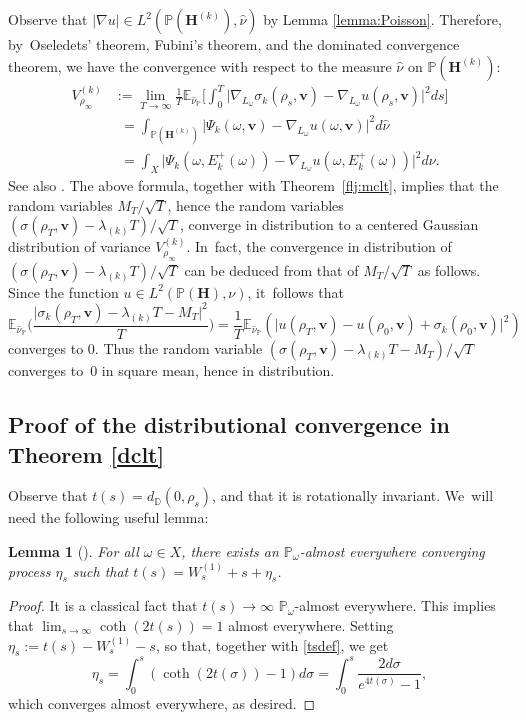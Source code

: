\documentclass[JEP,XML,SOM,Unicode,published]{cedram}
\theoremstyle{plain}
\newtheorem{lemma}[thm]{Lemma}
\theoremstyle{definition}
\numberwithin{equation}{subsection}
\newcommand\bD{\mathbb{D}}
\newcommand\bE{\mathbb{E}}
\newcommand\bP{\mathbb{P}}
\let\gradient\nabla
\newcommand{\bfH}{\boldsymbol{H}}
\newcommand{\bfv}{\boldsymbol{v}}
\newcommand{\bbE}[1]{\bE_{\hat{\nu}_\bP}\biggl[ #1 \biggr]}
\newcommand{\defeq}{:=}
\begin{document}
Observe that $|\gradient u| \in L^2(\bP(\bfH^{(k)}),\hat\nu)$ by Lemma \ref{lemma:Poisson}.
Therefore, by~Oseledets’ theorem, Fubini's theorem, and the dominated convergence theorem, we have the convergence with respect to the measure $\hat{\nu}$ on $\bP(\bfH^{(k)})$:
\begin{equation}
\label{variance}
\begin{aligned}
V^{(k)}_{\rho_\infty} &\defeq \lim_{T\to\infty} \frac{1}{T}\bbE{\int_0^T \bigl| \gradient_{L_\omega}\sigma_k(\rho_s,{\bfv})- \gradient_{L_\omega}u(\rho_s,{\bfv}) \bigr|^2ds} \\
&\phantom{:}= \int_{\bP(\bfH^{(k)})} \bigl |\Psi_k (\omega,{\bfv})-\gradient_{L_\omega}u(\omega,\bfv) \bigr|^2d \hat{\nu} \\
&\phantom{:}=\int_{X} \bigl |\Psi_k (\omega,E^+_k(\omega)) -
\gradient_{L_\omega}u(\omega,E^+_k(\omega)) \bigr|^2d \nu.\end{aligned}
\end{equation}
See also \cite[Cor.\,5.5]{For02}. The above formula, together with Theorem~\ref{flj:mclt}, implies that the random variables $M_T/ \sqrt{T}$, hence the random variables
$(\sigma(\rho_T,{\bfv}) -\lambda_{(k)} T)/\sqrt{T}$, converge in distribution to a centered Gaussian distribution of variance $V^{(k)}_{\rho_\infty}$. In~fact, the convergence in distribution of $(\sigma(\rho_T,{\bfv}) -\lambda_{(k)} T)/\sqrt{T}$ can be deduced from that of $M_T/ \sqrt{T}$
as follows. Since the function $u \in L^2(\bP(\bfH),\nu)$, it~follows that
\[
\bE_{{\hat{\nu}_\bP}} \Big(\frac{\vert \sigma_k(\rho_T,{\bfv}) -\lambda_{(k)} T - M_T\vert^2}{T}\Big) = \frac{1}{T} \bE_{{\hat{\nu}_\bP}}(\vert u(\rho_T, \bfv)- u(\rho_0, \bfv) + \sigma_k(\rho_0, \bfv)\vert^2)
\]
converges to $0$. Thus the random variable $(\sigma(\rho_T,{\bfv}) -\lambda_{(k)} T -M_T)/\sqrt{T}$ converges to~$0$ in square mean,
hence in distribution. \hfill\qedsymbol

\subsection{Proof of the distributional convergence in Theorem \ref{dclt}}

Observe that $t(s) = d_{\bD}(0,\rho_s)$, and that it is rotationally invariant. We~will need the following useful lemma:

\begin{lemma}[{\cite[Lem.\,VII.7.2.1]{FL12}}]\label{LFL}
For all $\omega \in X$, there exists an $\bP_\omega$-almost everywhere converging process $\eta_s$ such that $t(s) = W_s^{(1)} + s+\eta_s$.
\end{lemma}
\begin{proof}
It is a classical fact that $t(s)\to\infty$ $\bP_\omega$-almost everywhere. This implies that $\lim_{s\to\infty} \coth (2t(s)) = 1$ almost everywhere. Setting $\eta_s \defeq t(s) - W_s^{(1)} - s$, so that, together with \eqref{tsdef}, we get
\[
\eta_s = \int_{0}^s (\coth(2t(\sigma)) -1)d\sigma = \int_{0}^s \frac{2d\sigma}{e^{4t(\sigma)} -1},
\] which converges almost everywhere, as desired.
\end{proof}
\end{document}
